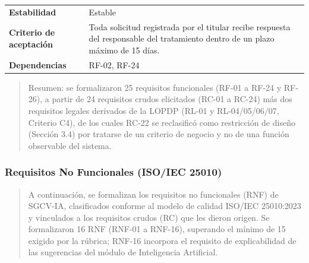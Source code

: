 {\begin{longtable}[]{@{}
  >{\raggedright\arraybackslash}p{}
  >{\raggedright\arraybackslash}p{}@{}}
\textbf{Estabilidad} & \begin{minipage}[t]{\linewidth}\raggedright
Estable
\end{minipage} \\
\textbf{Criterio de aceptación} &
\begin{minipage}[t]{\linewidth}\raggedright
Toda solicitud registrada por el titular recibe respuesta del
responsable del tratamiento dentro de un plazo máximo de 15 días.
\end{minipage} \\
\textbf{Dependencias} & \begin{minipage}[t]{\linewidth}\raggedright
RF-02, RF-24
\end{minipage} \\
\end{longtable}
}

\begin{quote}
Resumen: se formalizaron 25 requisitos funcionales (RF-01 a RF-24 y
RF-26), a partir de 24 requisitos crudos elicitados (RC-01 a RC-24) más
dos requisitos legales derivados de la LOPDP (RL-01 y
RL-04/05/06/07, Criterio C4), de los cuales RC-22 se reclasificó como
restricción de diseño (Sección 3.4) por tratarse de un criterio de
negocio y no de una
función observable del sistema.
\end{quote}

\subsubsection{Requisitos No Funcionales (ISO/IEC
25010)}\label{requisitos-no-funcionales-isoiec-25010}

\begin{quote}
A continuación, se formalizan los requisitos no funcionales (RNF) de
SGCV-IA, clasificados conforme al modelo de calidad ISO/IEC 25010:2023 y
vinculados a los requisitos crudos (RC) que les dieron origen. Se
formalizaron 16 RNF (RNF-01 a RNF-16), superando el mínimo de 15
exigido por la rúbrica; RNF-16 incorpora el requisito de explicabilidad
de las sugerencias del módulo de Inteligencia Artificial.
\end{quote}

